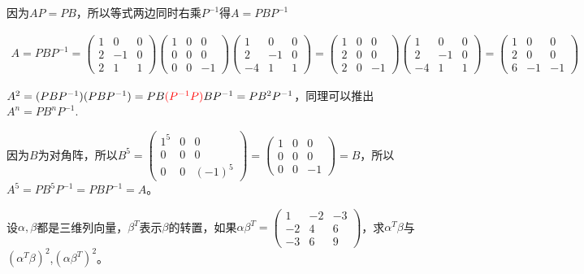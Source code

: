 \documentclass[a4paper]{report}
\begin{document}
\begin{jie}
因为$AP=PB$，所以等式两边同时右乘$P^{-1}$得$A=PBP^{-1}$

\begin{align*}
A=PBP^{-1}=
\begin{pmatrix}
1&0&0\\
2&-1&0\\
2&1&1
\end{pmatrix}
\begin{pmatrix}
1&0&0\\
0&0&0\\
0&0&-1
\end{pmatrix}
\begin{pmatrix}
1&0&0\\
2&-1&0\\
-4&1&1
\end{pmatrix}=
\begin{pmatrix}
1&0&0\\
2&0&0\\
2&0&-1
\end{pmatrix}
\begin{pmatrix}
1&0&0\\
2&-1&0\\
-4&1&1
\end{pmatrix}=
\begin{pmatrix}
1&0&0\\
2&0&0\\
6&-1&-1
\end{pmatrix}
\end{align*}

$A^2=
(PBP^{-1})(PBP^{-1})=PB\textcolor[rgb]{1.00,0.00,0.00}{(P^{-1}P)}BP^{-1}=PB^2P^{-1}
$，同理可以推出$A^n=PB^nP^{-1}$.

因为$B$为对角阵，所以$B^5
=\begin{pmatrix}
1^5&0&0\\
0&0&0\\
0&0&(-1)^5
 \end{pmatrix}=
 \begin{pmatrix}
 1&0&0\\
0&0&0\\
0&0&-1
 \end{pmatrix}=B
$，所以$A^5=PB^5P^{-1}=PBP^{-1}=A$。
\end{jie}

\EX 设$\alpha,\beta$都是三维列向量，$\beta^T$表示$\beta$的转置，如果$\alpha\beta^T=
\begin{pmatrix}
1&-2&-3\\
-2&4&6\\
-3&6&9
\end{pmatrix}
$，求$\alpha^T\beta$与$(\alpha^T\beta)^2$,$(\alpha\beta^T)^2$。
\end{document}
